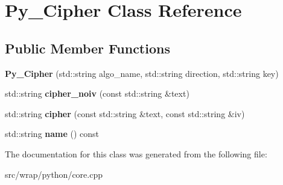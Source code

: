 \hypertarget{classPy__Cipher}{\section{Py\-\_\-\-Cipher Class Reference}
\label{classPy__Cipher}
}
\subsection*{Public Member Functions}
\begin{DoxyCompactItemize}
\item 
\hypertarget{classPy__Cipher_a463f2b190b50dba911a4267527703d91}{{\bfseries Py\-\_\-\-Cipher} (std\-::string algo\-\_\-name, std\-::string direction, std\-::string key)}\label{classPy__Cipher_a463f2b190b50dba911a4267527703d91}

\item 
\hypertarget{classPy__Cipher_a1708a763603d1cfb3c57f30bb1b6a59d}{std\-::string {\bfseries cipher\-\_\-noiv} (const std\-::string \&text)}\label{classPy__Cipher_a1708a763603d1cfb3c57f30bb1b6a59d}

\item 
\hypertarget{classPy__Cipher_a569e2f6fb27b26522ad84c6037202625}{std\-::string {\bfseries cipher} (const std\-::string \&text, const std\-::string \&iv)}\label{classPy__Cipher_a569e2f6fb27b26522ad84c6037202625}

\item 
\hypertarget{classPy__Cipher_a9118f9a84ccf05b90dee54258ff240b9}{std\-::string {\bfseries name} () const }\label{classPy__Cipher_a9118f9a84ccf05b90dee54258ff240b9}

\end{DoxyCompactItemize}


The documentation for this class was generated from the following file\-:\begin{DoxyCompactItemize}
\item 
src/wrap/python/core.\-cpp\end{DoxyCompactItemize}
